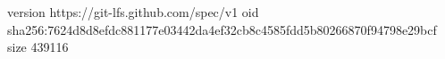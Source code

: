 version https://git-lfs.github.com/spec/v1
oid sha256:7624d8d8efdc881177e03442da4ef32cb8c4585fdd5b80266870f94798e29bcf
size 439116
